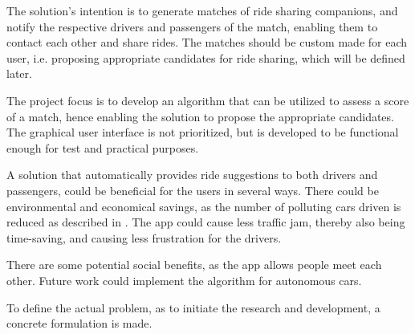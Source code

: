 The solution's intention is to generate matches of ride sharing companions, and notify the respective drivers and passengers of the match, enabling them to contact each other and share rides.
The matches should be custom made for each user, i.e. proposing appropriate candidates for ride sharing, which will be defined later.

The project focus is to develop an algorithm that can be utilized to assess a score of a match, hence enabling the solution to propose the appropriate candidates. The graphical user interface is not prioritized, but is developed to be functional enough for test and practical purposes.

A solution that automatically provides ride suggestions to both drivers and passengers, could be beneficial for the users in several ways. There could be environmental and economical savings, as the number of polluting cars driven is reduced as described in \cite{doi:10.1080/01441647.2011.621557}. The app could cause less traffic jam, thereby also being time-saving, and causing less frustration for the drivers.

There are some potential social benefits, as the app allows people meet each other. Future work could implement the algorithm for autonomous cars.

\iffalse
Since employers usually are located in the same area, and commuters could live in the same area, there should be a possibility for the commuters  potentially share cars and thereby reduce traffic.
There are many apps\todo{source and define 'app'} that allow users to request and give rides\todo{define}, but they require active participation of the users to do so. 
\fi

To define the actual problem, as to initiate the research and development, a concrete formulation is made.